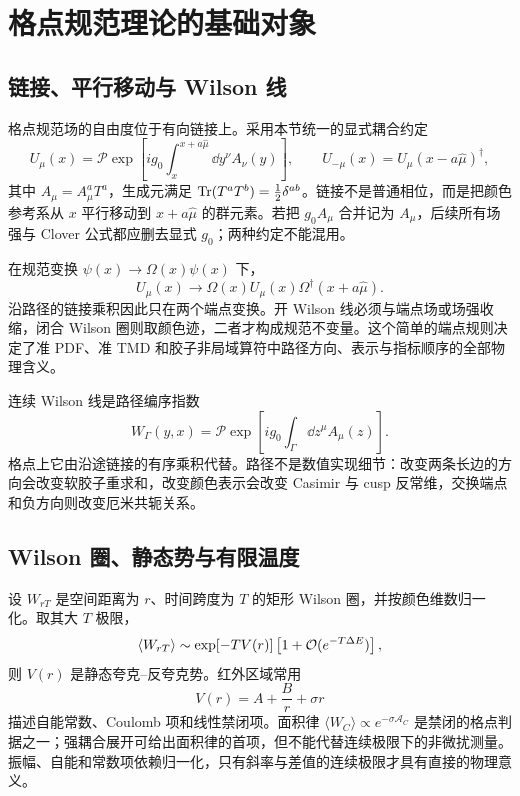 \chapter{格点规范理论的基础对象}

\section{链接、平行移动与 Wilson 线}

格点规范场的自由度位于有向链接上。采用本节统一的显式耦合约定
\begin{equation}
  U_\mu(x)=\mathcal P\exp\!\left[i g_0\int_x^{x+a\hat\mu}\!\dd y^\nu A_\nu(y)\right],
  \qquad
  U_{-\mu}(x)=U_\mu(x-a\hat\mu)^\dagger ,
  \label{eq:link-definition}
\end{equation}
其中 \(A_\mu=A_\mu^aT^a\)，生成元满足 \(\operatorname{Tr}(T^aT^b)=\tfrac12\delta^{ab}\)。链接不是普通相位，而是把颜色参考系从 \(x\) 平行移动到 \(x+a\hat\mu\) 的群元素。若把 \(g_0A_\mu\) 合并记为 \(A_\mu\)，后续所有场强与 Clover 公式都应删去显式 \(g_0\)；两种约定不能混用。

在规范变换 \(\psi(x)\to\Omega(x)\psi(x)\) 下，
\begin{equation}
  U_\mu(x)\longrightarrow \Omega(x)U_\mu(x)\Omega^\dagger(x+a\hat\mu).
  \label{eq:link-gauge}
\end{equation}
沿路径的链接乘积因此只在两个端点变换。开 Wilson 线必须与端点场或场强收缩，闭合 Wilson 圈则取颜色迹，二者才构成规范不变量。这个简单的端点规则决定了准 PDF、准 TMD 和胶子非局域算符中路径方向、表示与指标顺序的全部物理含义。

连续 Wilson 线是路径编序指数
\begin{equation}
  W_\Gamma(y,x)=\mathcal P\exp\!\left[i g_0\int_\Gamma \dd z^\mu A_\mu(z)\right].
  \label{eq:wilson-line}
\end{equation}
格点上它由沿途链接的有序乘积代替。路径不是数值实现细节：改变两条长边的方向会改变软胶子重求和，改变颜色表示会改变 Casimir 与 cusp 反常维，交换端点和负方向则改变厄米共轭关系。

\section{Wilson 圈、静态势与有限温度}

设 \(W_{rT}\) 是空间距离为 \(r\)、时间跨度为 \(T\) 的矩形 Wilson 圈，并按颜色维数归一化。取其大 \(T\) 极限，
\begin{equation}
  \langle W_{rT}\rangle
  \sim \exp[-T V(r)]\left[1+\mathcal{O}(e^{-T\Delta E})\right],
  \label{eq:wilson-loop-potential}
\end{equation}
则 \(V(r)\) 是静态夸克--反夸克势。红外区域常用
\begin{equation}
  V(r)=A+\frac{B}{r}+\sigma r
  \label{eq:static-potential}
\end{equation}
描述自能常数、Coulomb 项和线性禁闭项。面积律 \(\langle W_C\rangle\propto e^{-\sigma\mathcal A_C}\) 是禁闭的格点判据之一；强耦合展开可给出面积律的首项，但不能代替连续极限下的非微扰测量。振幅、自能和常数项依赖归一化，只有斜率与差值的连续极限才具有直接的物理意义。

